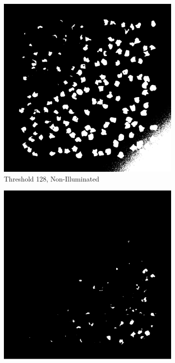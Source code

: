 \documentclass[%
	a4paper, %
	12pt, %
	english, %
	bibtotoc %
]{scrartcl}
\begin{document}
\begin{figure}[H]
    \centering
    \begin{subfigure}{0.3\linewidth}
        \includegraphics[width=\linewidth]{latex-template-ss24/images/segmentation_128_threshold_non_illuminated.png}
        \caption{Threshold 128, Non-Illuminated}
        \label{fig:segmentation_128_threshold_non_illuminated}
    \end{subfigure}
    \begin{subfigure}{0.3\linewidth}
        \includegraphics[width=\linewidth]{latex-template-ss24/images/segmentation_200_threshold_non_illuminated.png}

\end{subfigure}
\end{figure}
\end{document}
